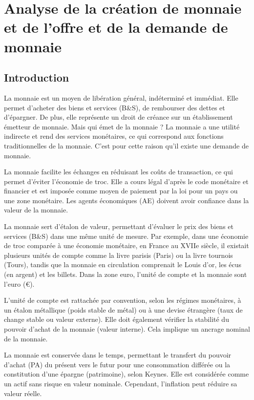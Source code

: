 \documentclass[a4paper, 12pt]{report}
\begin{document}
	
\chapter{Analyse de la création de	monnaie et de l'offre et de la demande de monnaie}
	
\section*{Introduction}


La monnaie est un moyen de libération général, indéterminé et immédiat. Elle permet d'acheter des biens et services (B\&S), de rembourser des dettes et d'épargner. De plus, elle représente un droit de créance sur un établissement émetteur de monnaie. Mais qui émet de la monnaie ? La monnaie a une utilité indirecte et rend des services monétaires, ce qui correspond aux fonctions traditionnelles de la monnaie. C'est pour cette raison qu'il existe une demande de monnaie.

La monnaie facilite les échanges en réduisant les coûts de transaction, ce qui permet d'éviter l'économie de troc. Elle a cours légal d'après le code monétaire et financier et est imposée comme moyen de paiement par la loi pour un pays ou une zone monétaire. Les agents économiques (AE) doivent avoir confiance dans la valeur de la monnaie.

La monnaie sert d'étalon de valeur, permettant d'évaluer le prix des biens et services (B\&S) dans une même unité de mesure. Par exemple, dans une économie de troc comparée à une économie monétaire, en France au XVIIe siècle, il existait plusieurs unités de compte comme la livre parisis (Paris) ou la livre tournois (Tours), tandis que la monnaie en circulation comprenait le Louis d’or, les écus (en argent) et les billets. Dans la zone euro, l'unité de compte et la monnaie sont l'euro (\euro).

L'unité de compte est rattachée par convention, selon les régimes monétaires, à un étalon métallique (poids stable de métal) ou à une devise étrangère (taux de change stable ou valeur externe). Elle doit également vérifier la stabilité du pouvoir d'achat de la monnaie (valeur interne). Cela implique un ancrage nominal de la monnaie.

La monnaie est conservée dans le temps, permettant le transfert du pouvoir d'achat (PA) du présent vers le futur pour une consommation différée ou la constitution d'une épargne (patrimoine), selon Keynes. Elle est considérée comme un actif sans risque en valeur nominale. Cependant, l'inflation peut réduire sa valeur réelle.
\end{document}
